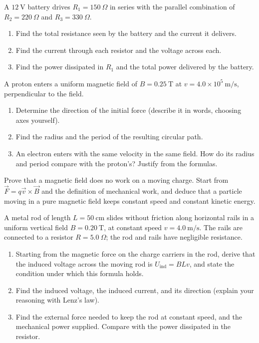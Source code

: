 \begin{exercise}\label{ex:em-4}
A $12\ \mathrm{V}$ battery drives $R_1 = 150\ \Omega$ in series with the parallel combination of $R_2 = 220\ \Omega$ and $R_3 = 330\ \Omega$.
\begin{enumerate}[label=(\alph*)]
  \item Find the total resistance seen by the battery and the current it delivers.
  \item Find the current through each resistor and the voltage across each.
  \item Find the power dissipated in $R_1$ and the total power delivered by the battery.
\end{enumerate}
\end{exercise}

\begin{exercise}\label{ex:em-5}
A proton enters a uniform magnetic field of $B = 0.25\ \mathrm{T}$ at $v = 4.0\times 10^{5}\ \mathrm{m/s}$, perpendicular to the field.
\begin{enumerate}[label=(\alph*)]
  \item Determine the direction of the initial force (describe it in words, choosing axes yourself).
  \item Find the radius and the period of the resulting circular path.
  \item An electron enters with the same velocity in the same field. How do its radius and period compare with the proton's? Justify from the formulas.
\end{enumerate}
\end{exercise}

\begin{exercise}\label{ex:em-6}
Prove that a magnetic field does no work on a moving charge. Start from $\vec{F} = q\vec{v}\times\vec{B}$ and the definition of mechanical work, and deduce that a particle moving in a pure magnetic field keeps constant speed and constant kinetic energy.
\end{exercise}

\begin{exercise}\label{ex:em-7}
A metal rod of length $L = 50\ \mathrm{cm}$ slides without friction along horizontal rails in a uniform vertical field $B = 0.20\ \mathrm{T}$, at constant speed $v = 4.0\ \mathrm{m/s}$. The rails are connected to a resistor $R = 5.0\ \Omega$; the rod and rails have negligible resistance.
\begin{enumerate}[label=(\alph*)]
  \item Starting from the magnetic force on the charge carriers in the rod, derive that the induced voltage across the moving rod is $U_\text{ind} = BLv$, and state the condition under which this formula holds.
  \item Find the induced voltage, the induced current, and its direction (explain your reasoning with Lenz's law).
  \item Find the external force needed to keep the rod at constant speed, and the mechanical power supplied. Compare with the power dissipated in the resistor.
\end{enumerate}
\end{exercise}

